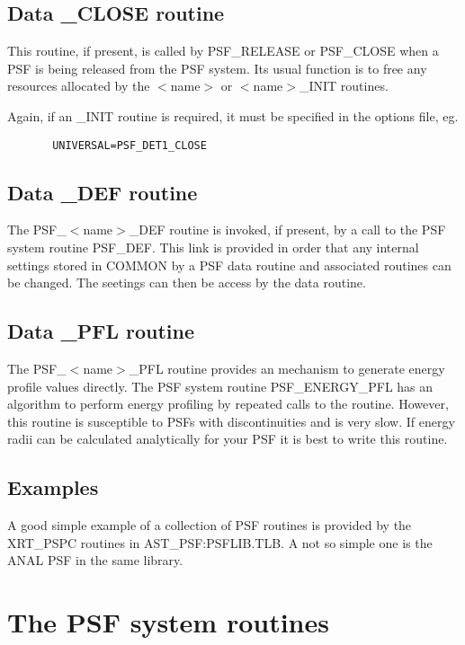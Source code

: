 \subsection{Data \_CLOSE routine}
  
     This routine, if present, is called by PSF\_RELEASE or PSF\_CLOSE
     when a PSF is being released from the PSF system. Its usual
     function is to free any resources allocated by the $<$name$>$ or
     $<$name$>$\_INIT routines.

     Again, if an \_INIT routine is required, it must be specified in
     the options file, eg.

\begin{verbatim}
       UNIVERSAL=PSF_DET1_CLOSE
\end{verbatim}

\subsection{Data \_DEF routine}

     The PSF\_$<$name$>$\_DEF routine is invoked, if present, by a call to 
     the PSF system routine PSF\_DEF. This link is provided in order 
     that any internal settings stored in COMMON by a PSF data routine
     and associated routines can be changed. The seetings can then
     be access by the data routine.

\subsection{Data \_PFL routine}

     The PSF\_$<$name$>$\_PFL routine provides an mechanism to generate
     energy profile values directly. The PSF system routine 
     PSF\_ENERGY\_PFL has an algorithm to perform energy profiling
     by repeated calls to the routine. However, this routine is
     susceptible to PSFs with discontinuities and is very slow.
     If energy radii can be calculated analytically for your PSF
     it is best to write this routine.

\subsection{Examples}

     A good simple example of a collection of PSF routines is
     provided by the XRT\_PSPC routines in AST\_PSF:PSFLIB.TLB. A
     not so simple one is the ANAL PSF in the same library.

\section{The PSF system routines}

